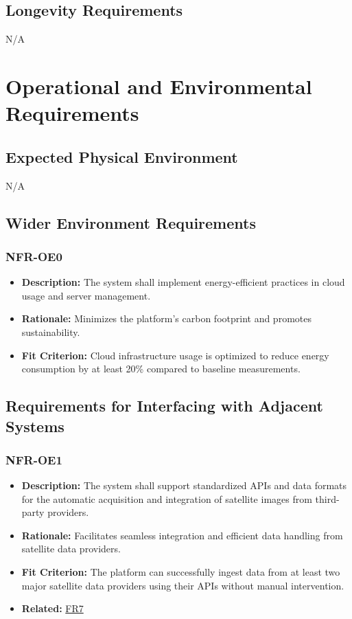 \documentclass[12pt]{article}
\begin{document}
\subsection{Longevity Requirements}
N/A


\section{Operational and Environmental Requirements}
\subsection{Expected Physical Environment}
N/A
\subsection{Wider Environment Requirements}
\subsubsection*{NFR-OE0}
\label{sec:OE0}
\begin{itemize}
  \item \textbf{Description:} The system shall implement energy-efficient practices in cloud usage and server management.
  \item \textbf{Rationale:} Minimizes the platform’s carbon footprint and promotes sustainability.
  \item \textbf{Fit Criterion:} Cloud infrastructure usage is optimized to reduce energy consumption by at least 20\% compared to baseline measurements.
\end{itemize}
\subsection{Requirements for Interfacing with Adjacent Systems}
\subsubsection*{NFR-OE1}
\label{sec:OE1}
\begin{itemize}
  \item \textbf{Description:} The system shall support standardized APIs and data formats for the automatic acquisition and integration of satellite images from third-party providers.
  \item \textbf{Rationale:} Facilitates seamless integration and efficient data handling from satellite data providers.
  \item \textbf{Fit Criterion:} The platform can successfully ingest data from at least two major satellite data providers using their APIs without manual intervention.
  \item \textbf{Related:} \hyperref[sec:FR7]{FR7}
\end{itemize}
\end{document}
